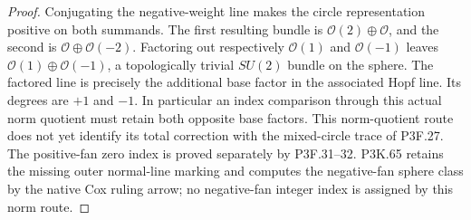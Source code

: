 \begin{proof}
Conjugating the negative-weight line makes the circle representation positive on both summands. The first resulting bundle is \(\mathcal O(2)\oplus\mathcal O\), and the second is \(\mathcal O\oplus\mathcal O(-2)\). Factoring out respectively \(\mathcal O(1)\) and \(\mathcal O(-1)\) leaves \(\mathcal O(1)\oplus\mathcal O(-1)\), a topologically trivial \(SU(2)\) bundle on the sphere. The factored line is precisely the additional base factor in the associated Hopf line. Its degrees are \(+1\) and \(-1\). In particular an index comparison through this actual norm quotient must retain both opposite base factors. This norm-quotient route does not yet identify its total correction with the mixed-circle trace of P3F.27. The positive-fan zero index is proved separately by P3F.31--32. P3K.65 retains the missing outer normal-line marking and computes the negative-fan sphere class by the native Cox ruling arrow; no negative-fan integer index is assigned by this norm route.
\end{proof}
